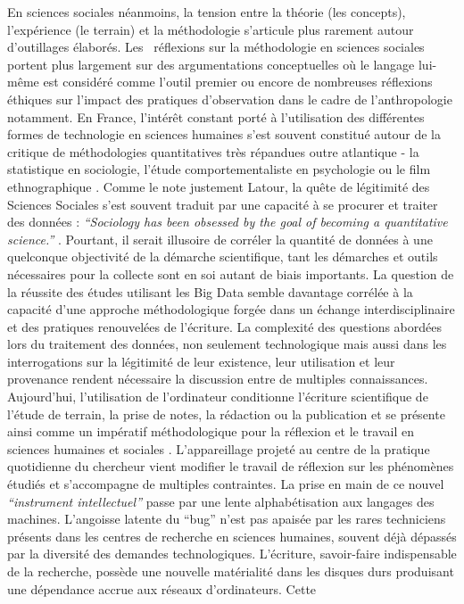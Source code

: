 En sciences sociales néanmoins, la tension entre la théorie (les concepts), l{\textquoteright}expérience (le terrain) et la méthodologie s{\textquoteright}articule plus rarement autour d{\textquoteright}outillages élaborés. Les \ réflexions sur la méthodologie en sciences sociales portent plus largement sur des argumentations conceptuelles o\`u le langage lui-m\^eme est considéré comme l{\textquoteright}outil premier ou encore de nombreuses réflexions éthiques sur l{\textquoteright}impact des pratiques d{\textquoteright}observation dans le cadre de l{\textquoteright}anthropologie notamment. En France, l{\textquoteright}intér\^et constant porté à l{\textquoteright}utilisation des différentes formes de technologie en sciences humaines s{\textquoteright}est souvent constitué autour de la critique de méthodologies quantitatives très répandues outre atlantique - la statistique en sociologie, l{\textquoteright}étude comportementaliste en psychologie ou le film ethnographique \citep{Becker1996}. Comme le note justement Latour, la qu\^ete de légitimité des Sciences Sociales s{\textquoteright}est souvent traduit par une capacité à se procurer et traiter des données : \textit{{\textquotedblleft}Sociology has been obsessed by the goal of becoming a quantitative science.{\textquotedblright}} \citep{Latour2003}. Pourtant, il serait illusoire de corréler la quantité de données à une quelconque objectivité de la démarche scientifique, tant les démarches et outils nécessaires pour la collecte sont en soi autant de biais importants. La question de la réussite des études utilisant les Big Data semble davantage corrélée à la capacité d{\textquoteright}une approche méthodologique forgée dans un échange interdisciplinaire et des pratiques renouvelées de l{\textquoteright}écriture. La complexité des questions abordées lors du traitement des données, non seulement technologique mais aussi dans les interrogations sur la légitimité de leur existence, leur utilisation et leur provenance \citep{Boyd2011} rendent nécessaire la discussion entre de multiples connaissances. Aujourd{\textquoteright}hui, l{\textquoteright}utilisation de l{\textquoteright}ordinateur conditionne l{\textquoteright}écriture scientifique de l{\textquoteright}étude de terrain, la prise de notes, la rédaction ou la publication et se présente ainsi comme un impératif méthodologique pour la réflexion et le travail en sciences humaines et sociales \citep{Wieviorka2013}. L{\textquoteright}appareillage projeté au centre de la pratique quotidienne du chercheur vient modifier le travail de réflexion sur les phénomènes étudiés et s{\textquoteright}accompagne de multiples contraintes. La prise en main de ce nouvel \textit{{\textquotedblleft}instrument intellectuel{\textquotedblright} }\citep{Guichard2014} passe par une lente alphabétisation aux langages des machines. L{\textquoteright}angoisse latente du {\textquotedblleft}bug{\textquotedblright} n{\textquoteright}est pas apaisée par les rares techniciens présents dans les centres de recherche en sciences humaines, souvent déjà dépassés par la diversité des demandes technologiques. L{\textquoteright}écriture, savoir-faire indispensable de la recherche, possède une nouvelle matérialité dans les disques durs produisant une dépendance accrue aux réseaux d{\textquoteright}ordinateurs. Cette 